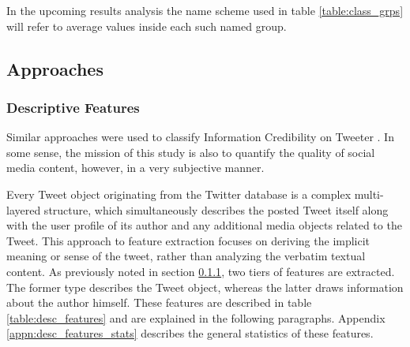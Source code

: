 		In the upcoming results analysis the name scheme used in table \ref{table:class_grps} will refer to average values inside each such named group. 
	
	\subsection{Approaches}
		\label{section:feature_types}
		\subsubsection{Descriptive Features}
			\label{section:Descriptive_Features}
			Similar approaches were used to classify Information Credibility on Tweeter \cite{castillo2011information}. In some sense, the mission of this study is also to quantify the quality of social media content, however, in a very subjective manner.
			\par	
		
			Every Tweet object originating from the Twitter database is a complex multi-layered structure, which  simultaneously describes the posted Tweet itself along with the user profile of its author and any additional media objects related to the Tweet. This approach to feature extraction focuses on deriving the implicit meaning or sense of the tweet, rather than analyzing the verbatim textual content. As previously noted in section \ref{section:Descriptive_Features}, two tiers of features are extracted. The former type describes the Tweet object, whereas the latter draws information about the author himself. These features are described in table \ref{table:desc_features} and are explained in the following paragraphs. Appendix \ref{appn:desc_features_stats} describes the general statistics of these features. 
			

